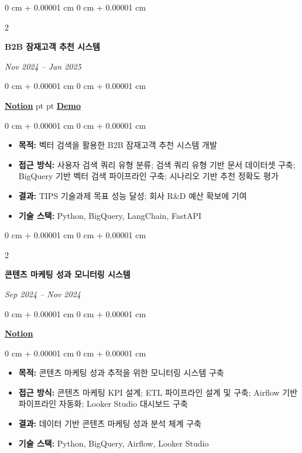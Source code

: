 \documentclass[10pt, letterpaper]{article}
\newenvironment{highlights}{
    \begin{itemize}[
        topsep=0.10 cm,
        parsep=0.10 cm,
        partopsep=0pt,
        itemsep=0pt,
        leftmargin=0 cm + 10pt
    ]
}{
    \end{itemize}
} %
\newenvironment{onecolentry}{
    \begin{adjustwidth}{
        0 cm + 0.00001 cm
    }{
        0 cm + 0.00001 cm
    }
}{
    \end{adjustwidth}
} %
\newenvironment{twocolentry}[2][]{
    \onecolentry
    \def\secondColumn{\textit{#2}}
    \setcolumnwidth{\fill, 4.5 cm}
    \begin{paracol}{2}
}{
    \switchcolumn \raggedleft \secondColumn
    \end{paracol}
    \endonecolentry
} %
\begin{document}
        \vspace{0.2 cm}
        \begin{twocolentry}{
            Nov 2024 -- Jan 2025
        }
            \textbf{B2B 잠재고객 추천 시스템}
        \end{twocolentry}
        \begin{onecolentry}
            \href{https://awake-kumquat-803.notion.site/B2B-1b674ec8f7038011abc0eed294e7e3fd?source=copy_link}{\textbf{Notion}}
             pt
            \AND
             pt
            \href{https://drive.google.com/file/d/15kzsuUMp8jopIicWKQSa0dzpCdr2_sCF/view?usp=drive_link}{\textbf{Demo}}
        \end{onecolentry}

        \vspace{0.10 cm}
        \begin{onecolentry}
            \begin{highlights}
                \item \textbf{목적:} 벡터 검색을 활용한 B2B 잠재고객 추천 시스템 개발
                \item \textbf{접근 방식:} 사용자 검색 쿼리 유형 분류; 검색 쿼리 유형 기반 문서 데이터셋 구축; BigQuery 기반 벡터 검색 파이프라인 구축; 시나리오 기반 추천 정확도 평가
                \item \textbf{결과:} TIPS 기술과제 목표 성능 달성; 회사 R\&D 예산 확보에 기여
                \item \textbf{기술 스택:} Python, BigQuery, LangChain, FastAPI
            \end{highlights}
        \end{onecolentry}

        \vspace{0.2 cm}
        \begin{twocolentry}{
            Sep 2024 -- Nov 2024
        }
            \textbf{콘텐츠 마케팅 성과 모니터링 시스템}
        \end{twocolentry}
        \begin{onecolentry}
            \href{https://awake-kumquat-803.notion.site/1b574ec8f70380faad0af99f7de7b1a8?source=copy_link}{\textbf{Notion}}
        \end{onecolentry}

        \vspace{0.10 cm}
        \begin{onecolentry}
            \begin{highlights}
                \item \textbf{목적:} 콘텐츠 마케팅 성과 추적을 위한 모니터링 시스템 구축
                \item \textbf{접근 방식:} 콘텐츠 마케팅 KPI 설계; ETL 파이프라인 설계 및 구축; Airflow 기반 파이프라인 자동화; Looker Studio 대시보드 구축
                \item \textbf{결과:} 데이터 기반 콘텐츠 마케팅 성과 분석 체계 구축
                \item \textbf{기술 스택:} Python, BigQuery, Airflow, Looker Studio
            \end{highlights}
        \end{onecolentry}
\end{document}
